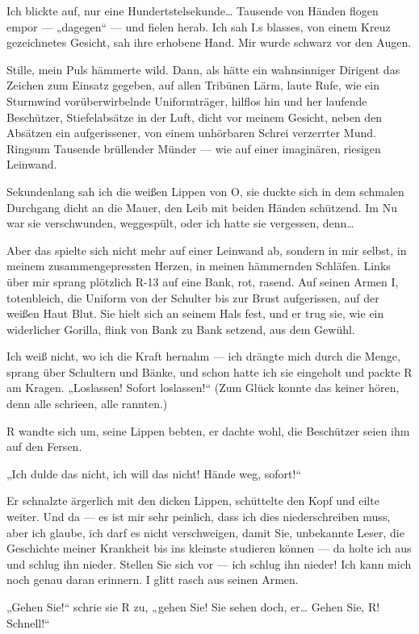 Ich blickte auf, nur eine Hundertstelsekunde\ldots{} Tausende von Händen
flogen empor — „dagegen“ — und fielen herab. Ich sah I.s blasses,
von einem Kreuz gezeichnetes Gesicht, sah ihre erhobene Hand. Mir
wurde schwarz vor den Augen.

Stille, mein Puls hämmerte wild. Dann, als hätte ein wahnsinniger
Dirigent das Zeichen zum Einsatz gegeben, auf allen Tribünen Lärm,
laute Rufe, wie ein Sturmwind vorüberwirbelnde Uniformträger,
hilflos hin und her
laufende Beschützer, Stiefelabsätze in der Luft, dicht vor meinem
Gesicht, neben den Absätzen ein aufgerissener, von einem unhörbaren
Schrei verzerrter Mund. Ringsum Tausende brüllender Münder — wie
auf einer imaginären, riesigen Leinwand.

Sekundenlang sah ich die weißen Lippen von O, sie duckte sich in
dem schmalen Durchgang dicht an die Mauer, den Leib mit beiden
Händen schützend. Im Nu war sie verschwunden, weggespült, oder ich
hatte sie vergessen, denn\ldots{}

Aber das spielte sich nicht mehr auf einer Leinwand ab, sondern in
mir selbst, in meinem zusammengepressten Herzen, in meinen
hämmernden Schläfen. Links über mir sprang plötzlich R-13 auf eine
Bank, rot, rasend. Auf seinen Armen I, totenbleich, die Uniform von
der Schulter bis zur Brust aufgerissen, auf der weißen Haut Blut.
Sie hielt sich an seinem Hals fest, und er trug sie, wie ein
widerlicher Gorilla, flink von Bank zu Bank setzend, aus dem
Gewühl.

Ich weiß nicht, wo ich die Kraft hernahm — ich drängte mich durch
die Menge, sprang über Schultern und Bänke, und schon hatte ich sie
eingeholt und packte R am Kragen. „Loslassen! Sofort loslassen!“
(Zum Glück konnte das keiner hören, denn alle schrieen, alle
rannten.)

R wandte sich um, seine Lippen bebten, er dachte wohl,
die Beschützer seien ihm auf den Fersen.

„Ich dulde das nicht, ich will das nicht! Hände weg, sofort!“

Er schnalzte ärgerlich mit den dicken Lippen, schüttelte den Kopf
und eilte weiter. Und da — es ist mir sehr peinlich, dass ich dies
niederschreiben muss, aber ich glaube, ich darf es nicht
verschweigen, damit Sie, unbekannte Leser, die Geschichte meiner
Krankheit bis ins kleinste studieren können — da holte ich aus und
schlug ihn nieder.
%
Stellen Sie sich vor — ich schlug ihn nieder! Ich kann mich noch
genau daran erinnern. I glitt rasch aus seinen Armen.

„Gehen Sie!“ schrie sie R zu, „gehen Sie! Sie sehen doch, er\ldots{}
Gehen Sie, R! Schnell!“

